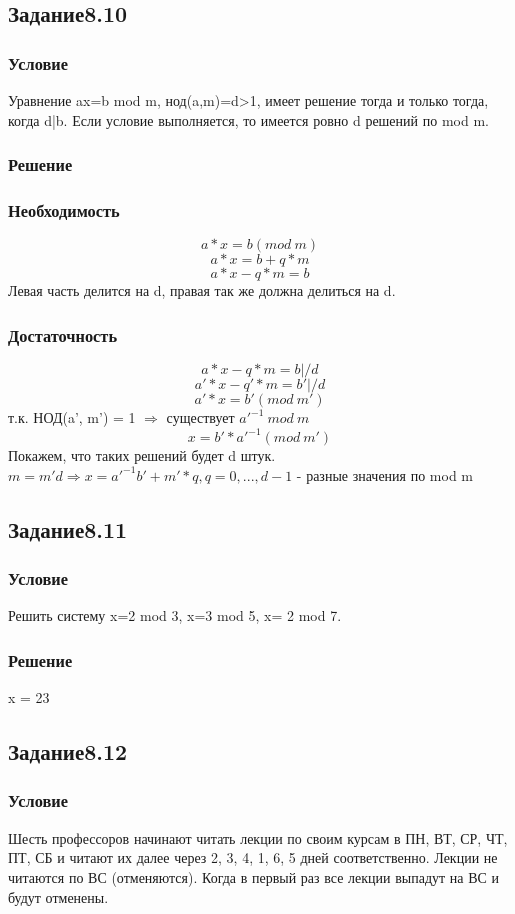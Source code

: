 \documentclass[10pt,a4paper]{article}
\begin{document}
\subsection*{Задание8.10}
\subsubsection*{Условие}
Уравнение ax=b mod m, нод(a,m)=d>1, имеет решение тогда и только
тогда, когда d|b. Если условие выполняется, то имеется ровно d решений
по mod m.
\subsubsection*{Решение} 
\subsubsection*{Необходимость}
$$ a*x = b (mod\ m) $$
$$ a*x = b + q*m $$
$$ a*x - q*m = b $$
Левая часть делится на d, правая так же должна делиться на d.
\subsubsection*{Достаточность}
$$ a*x - q*m = b | /d $$
$$ a'*x - q'*m = b' | /d $$
$$ a'*x = b' (mod\ m') $$
т.к. НОД(a', m') = 1 $\Rightarrow$ существует $ a'^{-1}\ mod\ m$
$$ x = b'*a'^{-1} (mod\ m') $$
Покажем, что таких решений будет d штук.
$ m = m'd \Rightarrow x = a'^{-1}b' + m'*q, q = 0,...,d-1 $ - разные
значения по mod m

\subsection*{Задание8.11}
\subsubsection*{Условие}
Решить систему x=2 mod 3, x=3 mod 5, x= 2 mod 7.
\subsubsection*{Решение}
x = 23

\subsection*{Задание8.12}
\subsubsection*{Условие}
Шесть профессоров начинают читать лекции по своим курсам в ПН, ВТ, СР,
ЧТ, ПТ, СБ и читают их далее через 2, 3, 4, 1, 6, 5 дней
соответственно. Лекции не читаются по ВС (отменяются). Когда в первый
раз все лекции выпадут на ВС и будут отменены.
\end{document}
